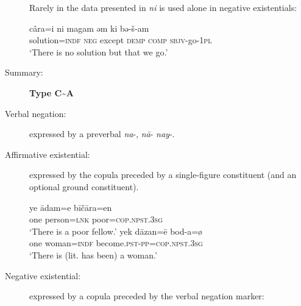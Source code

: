 \documentclass[output=paper,colorlinks,citecolor=brown]{langscibook}
\begin{document}
\begin{paperappendix}
\begin{unindented}
\begin{description}
Rarely in the data presented in \citealt{Paul2011} \textit{ni} is used alone in negative existentials:
%
\begin{exe}\ex
    \gll câra=i ni magam əm ki bə-š-am \\
solution=\textsc{indf} \textsc{neg} except \textsc{demp} \textsc{comp} \textsc{sbjv}-go-\textsc{1pl} \\
    \glt `There is no solution but that we go.' \citep[214]{Paul2011}  
    \end{exe}

\item[Summary:] \textbf{Type C{\textasciitilde}A}
\end{description}


 \parencite{NourzaeiJahani2015}
\begin{description}
\item[Verbal negation:] expressed by a preverbal \textit{na}-, \textit{nā}- \textit{nay}-.

\item[Affirmative existential:] expressed by the copula preceded by a single-figure constituent (and an optional ground constituent). 

\begin{exe}\ex \gll ye ādam=e bīčāra=en \\
one person=\textsc{lnk}   poor=\textsc{cop.npst.3sg} \\
    \glt `There is a poor fellow.' \parencite[31]{NourzaeiJahani2015}
\ex \gll yek dāzan=ē bod-a=ø \\
one woman=\textsc{indf} become.\textsc{pst-pp=cop.npst.3sg} \\
    \glt `There is (lit. has been) a woman.' \parencite[92]{NourzaeiJahani2015}
    \end{exe} 

\item[Negative existential:] expressed by a copula preceded by the verbal negation marker: 


\end{description}
\end{unindented}
\end{paperappendix}
\end{document}
